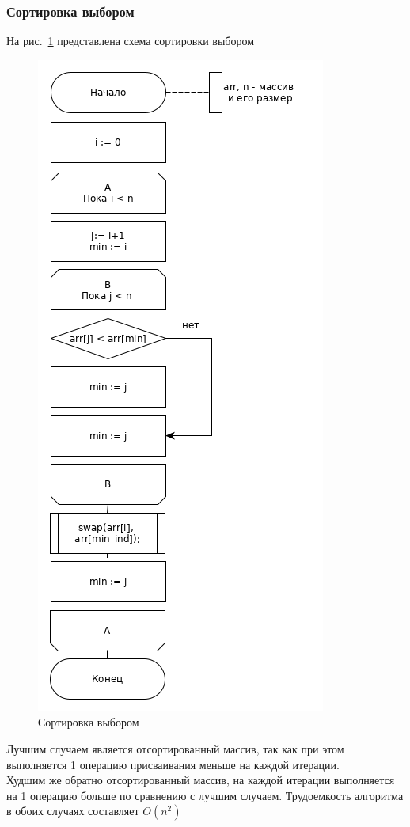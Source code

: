 \documentclass[a4paper,12pt]{article}
\begin{document}
    \subsubsection{Сортировка выбором}
            На рис.~\ref{ris:matr_dl_sh1} представлена схема сортировки выбором
            
\begin{figure}[H]
		 			\centering
		 			{
		 				\includegraphics[scale=0.51]{select.png}
		 				\caption{Сортировка выбором}
		 				\label{ris:matr_dl_sh1}
		 			}
		 		\end{figure}
	Лучшим случаем является отсортированный массив, так как при этом выполняется 1 операцию присваивания меньше на каждой итерации.\\
	Худшим же обратно отсортированный массив, на каждой итерации выполняется на 1 операцию больше по сравнению с лучшим случаем.
	Трудоемкость алгоритма в обоих случаях составляет $O(n^{2})$\cite{litlink1}
    \newpage
    \afterpage{\FloatBarrier}
    
\end{document}
